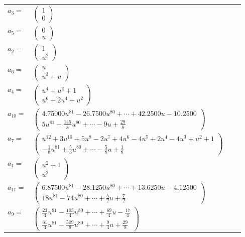 \documentclass[1p]{elsarticle_modified}
\theoremstyle{definition}
\begin{document}
\begin{tabular}{m{7pt} m{180pt} m{7pt} m{180pt} }
\flushright $a_{3}=$&$\begin{pmatrix}1\\0\end{pmatrix}$ \\
\flushright $a_{5}=$&$\begin{pmatrix}0\\u\end{pmatrix}$ \\
\flushright $a_{2}=$&$\begin{pmatrix}1\\u^2\end{pmatrix}$ \\
\flushright $a_{6}=$&$\begin{pmatrix}u\\u^3+u\end{pmatrix}$ \\
\flushright $a_{4}=$&$\begin{pmatrix}u^4+u^2+1\\u^6+2 u^4+u^2\end{pmatrix}$ \\
\flushright $a_{10}=$&$\begin{pmatrix}4.75000 u^{81}-26.7500 u^{80}+\cdots+42.2500 u-10.2500\\5 u^{81}-\frac{145}{8} u^{80}+\cdots-9 u+\frac{29}{8}\end{pmatrix}$ \\
\flushright $a_{7}=$&$\begin{pmatrix}u^{12}+3 u^{10}+5 u^8-2 u^7+4 u^6-4 u^5+2 u^4-4 u^3+u^2+1\\-\frac{1}{8} u^{81}+\frac{5}{8} u^{80}+\cdots-\frac{5}{8} u+\frac{1}{8}\end{pmatrix}$ \\
\flushright $a_{1}=$&$\begin{pmatrix}u^2+1\\u^2\end{pmatrix}$ \\
\flushright $a_{11}=$&$\begin{pmatrix}6.87500 u^{81}-28.1250 u^{80}+\cdots+13.6250 u-4.12500\\18 u^{81}-74 u^{80}+\cdots+\frac{5}{2} u+\frac{7}{2}\end{pmatrix}$ \\
\flushright $a_{9}=$&$\begin{pmatrix}\frac{23}{4} u^{81}-\frac{103}{4} u^{80}+\cdots+\frac{69}{4} u-\frac{17}{4}\\\frac{61}{4} u^{81}-\frac{509}{8} u^{80}+\cdots+\frac{9}{4} u+\frac{29}{8}\end{pmatrix}$ \\

\end{tabular}
\end{document}
